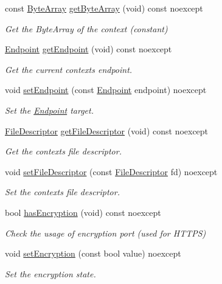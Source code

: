\begin{DoxyCompactItemize}
const \mbox{\hyperlink{namespaceo_z_abfa3f5a46e5c7584615dc1dd33fcafb6}{Byte\+Array}} \mbox{\hyperlink{classo_z_1_1_packet_a4919e1356309ad8c9d7595052d0ca498}{get\+Byte\+Array}} (void) const noexcept
\begin{DoxyCompactList}\small\item\em Get the Byte\+Array of the context (constant) \end{DoxyCompactList}\item 
\mbox{\hyperlink{classo_z_1_1_endpoint}{Endpoint}} \mbox{\hyperlink{classo_z_1_1_packet_a89367cc491fdfdb6bf88eda9bc4eb219}{get\+Endpoint}} (void) const noexcept
\begin{DoxyCompactList}\small\item\em Get the current context\textquotesingle{}s endpoint. \end{DoxyCompactList}\item 
void \mbox{\hyperlink{classo_z_1_1_packet_a2bcd9f2d612cbc1b59a8b7c99d706908}{set\+Endpoint}} (const \mbox{\hyperlink{classo_z_1_1_endpoint}{Endpoint}} endpoint) noexcept
\begin{DoxyCompactList}\small\item\em Set the \mbox{\hyperlink{classo_z_1_1_endpoint}{Endpoint}} target. \end{DoxyCompactList}\item 
\mbox{\hyperlink{namespaceo_z_acbb8d05709257b6414b3979597f88c0c}{File\+Descriptor}} \mbox{\hyperlink{classo_z_1_1_packet_a65cfd7021de4eaf78f716143b82cd4a1}{get\+File\+Descriptor}} (void) const noexcept
\begin{DoxyCompactList}\small\item\em Get the context\textquotesingle{}s file descriptor. \end{DoxyCompactList}\item 
void \mbox{\hyperlink{classo_z_1_1_packet_abf619a065ca7321c05fdcacc6353d47d}{set\+File\+Descriptor}} (const \mbox{\hyperlink{namespaceo_z_acbb8d05709257b6414b3979597f88c0c}{File\+Descriptor}} fd) noexcept
\begin{DoxyCompactList}\small\item\em Set the context\textquotesingle{}s file descriptor. \end{DoxyCompactList}\item 
bool \mbox{\hyperlink{classo_z_1_1_packet_abf9bd4979afb439272832d5a90f7d556}{has\+Encryption}} (void) const noexcept
\begin{DoxyCompactList}\small\item\em Check the usage of encryption port (used for H\+T\+T\+PS) \end{DoxyCompactList}\item 
void \mbox{\hyperlink{classo_z_1_1_packet_a7c6fc3f9ca25adf83be8e7c1f5ae5b70}{set\+Encryption}} (const bool value) noexcept
\begin{DoxyCompactList}\small\item\em Set the encryption state. \end{DoxyCompactList}\end{DoxyCompactItemize}


